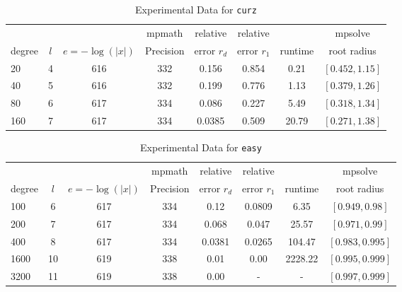 \documentclass[sigconf]{acmart}
\begin{document}
\begin{table}[t]
\caption{Experimental Data for \texttt{curz}} %
\label{tab:curz}
\vskip -0.15in
\begin{center}
\begin{small}
\begin{sc}
\begin{tabular}{lccccccc}
\toprule
             &       &                       & mpmath   & relative       & relative       &               & mpsolve \\
degree  & $l$ & $e=-\log(|x|)$ & Precision & error $r_d$ & error $r_1$ & runtime & root radius\\
\midrule
 20 & 4 & 616 & 332 & 0.156 & 0.854 & 0.21 & $[0.452, 1.15]$\\
 40 & 5 & 616 & 332 & 0.199 & 0.776 & 1.13 & $[0.379, 1.26]$\\
 80 & 6 & 617 & 334 & 0.086 & 0.227 & 5.49 & $[0.318, 1.34]$\\
 160 & 7 & 617 & 334 & 0.0385 & 0.509 & 20.79 & $[0.271, 1.38]$\\
\bottomrule
\end{tabular}
\end{sc}
\end{small}
\end{center}
\vskip 0.05in
\end{table}


\begin{table}[t]
\caption{Experimental Data for \texttt{easy}} %
\label{tab:easy}
\vskip -0.15in
\begin{center}
\begin{small}
\begin{sc}
\begin{tabular}{lccccccc}
\toprule
&  &  & mpmath & relative  & relative &  & mpsolve \\
degree  & $l$& $e=-\log(|x|)$& Precision &error $r_d$       & error $r_1$ &runtime& root radius\\
\midrule
 100 & 6 & 617 & 334 & 0.12 & 0.0809 & 6.35 & $[0.949, 0.98]$\\
 200 & 7 & 617 & 334 & 0.068 & 0.047 & 25.57 & $[0.971, 0.99]$\\
 400 & 8 & 617 & 334 & 0.0381 & 0.0265 & 104.47 & $[0.983, 0.995]$\\
 1600 &10& 619 & 338 & 0.01 & 0.00 & 2228.22 & $[0.995, 0.999]$\\ %
  3200 &11& 619 & 338 & 0.00 & - & - & $[0.997, 0.999]$\\ %
\bottomrule
\end{tabular}
\end{sc}
\end{small}
\end{center}
\vskip 0.05in
\end{table}
\end{document}
